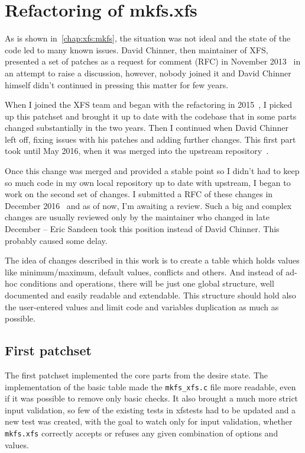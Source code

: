 \chapter{Refactoring of mkfs.xfs} \label{chap:refactoring}
As is shown in~\ref{chap:xfs:mkfs}, the situation was not ideal and the state of the code led to many known issues. David Chinner, then maintainer of XFS, presented a set of patches as a request for comment (RFC) in November 2013~\cite{davidsPatches} in an attempt to raise a discussion, however, nobody joined it and David Chinner himself didn't continued in pressing this matter for few years.

When I joined the XFS team and began with the refactoring in 2015~\cite{myFirstPatches}, I picked up this patchset and brought it up to date with the codebase that in some parts changed substantially in the two years. Then I continued when David Chinner left off, fixing issues with his patches and adding further changes. This first part took until May 2016, when it was merged into the upstream repository~\cite{finalPatchset1,finalPatchset1Announce}.

Once this change was merged and provided a stable point so I didn't had to keep so much code in my own local repository up to date with upstream, I began to work on the second set of changes. I submitted a RFC of these changes in December 2016~\cite{secondSetRFC} and as of now, I'm awaiting a review. Such a big and complex changes are usually reviewed only by the maintainer who changed in late December -- Eric Sandeen took this position instead of David Chinner. This probably caused some delay.

The idea of changes described in this work is to create a table which holds values like minimum/maximum, default values, conflicts and others. And instead of ad-hoc conditions and operations, there will be just one global structure, well documented and easily readable and extendable. This structure should hold also the user-entered values and limit code and variables duplication as much as possible.

\section{First patchset}\label{chap:refactoring:first}
The first patchset implemented the core parts from the desire state. The implementation of the basic table made the {\tt mkfs\_xfs.c} file more readable, even if it was possible to remove only basic checks. It also brought a much more strict input validation, so few of the existing tests in xfstests had to be updated and a new test was created, with the goal to watch only for input validation, whether {\tt mkfs.xfs} correctly accepts or refuses any given combination of options and values.


